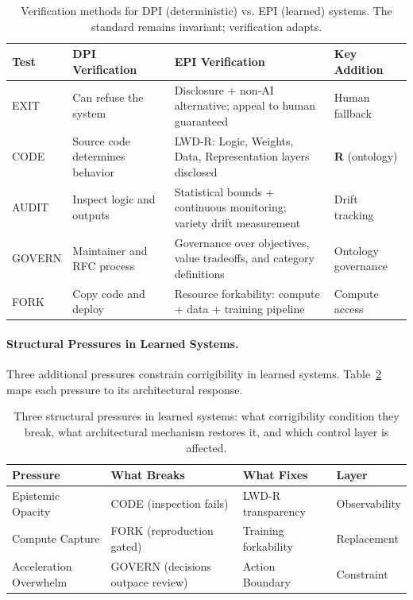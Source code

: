 \documentclass[11pt,a4paper]{article}
\theoremstyle{definition}
\begin{document}
\begin{table}[htbp]
\centering
\small
\begin{tabular}{@{}lp{3.5cm}p{4.5cm}p{3cm}@{}}
\toprule
\textbf{Test} & \textbf{DPI Verification} & \textbf{EPI Verification} & \textbf{Key Addition} \\
\midrule
EXIT & Can refuse the system & Disclosure + non-AI alternative; appeal to human guaranteed & Human fallback \\
CODE & Source code determines behavior & LWD-R: Logic, Weights, Data, Representation layers disclosed & \textbf{R} (ontology) \\
AUDIT & Inspect logic and outputs & Statistical bounds + continuous monitoring; variety drift measurement & Drift tracking \\
GOVERN & Maintainer and RFC process & Governance over objectives, value tradeoffs, and category definitions & Ontology governance \\
FORK & Copy code and deploy & Resource forkability: compute + data + training pipeline & Compute access \\
\bottomrule
\end{tabular}
\caption{Verification methods for DPI (deterministic) vs. EPI (learned) systems. The standard remains invariant; verification adapts.}
\label{tab:verification}
\end{table}

\paragraph{Structural Pressures in Learned Systems.} Three additional pressures constrain corrigibility in learned systems. Table~\ref{tab:structural-pressures} maps each pressure to its architectural response.

\begin{table}[htbp]
\centering
\small
\begin{tabular}{@{}llll@{}}
\toprule
\textbf{Pressure} & \textbf{What Breaks} & \textbf{What Fixes} & \textbf{Layer} \\
\midrule
Epistemic Opacity & CODE (inspection fails) & LWD-R transparency & Observability \\
Compute Capture & FORK (reproduction gated) & Training forkability & Replacement \\
Acceleration Overwhelm & GOVERN (decisions outpace review) & Action Boundary & Constraint \\
\bottomrule
\end{tabular}
\caption{Three structural pressures in learned systems: what corrigibility condition they break, what architectural mechanism restores it, and which control layer is affected.}
\label{tab:structural-pressures}
\end{table}
\end{document}
